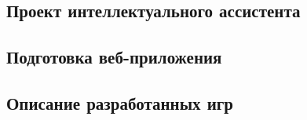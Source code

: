 

\subsection{Проект интеллектуального ассистента}



\subsection{Подготовка веб-приложения}



\subsection{Описание разработанных игр}





